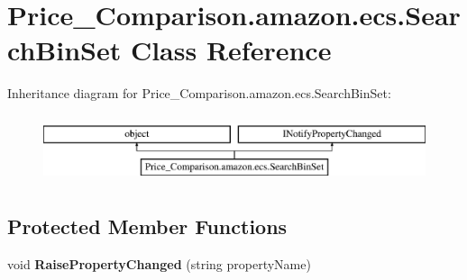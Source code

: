 \hypertarget{class_price___comparison_1_1amazon_1_1ecs_1_1_search_bin_set}{\section{Price\-\_\-\-Comparison.\-amazon.\-ecs.\-Search\-Bin\-Set Class Reference}
\label{class_price___comparison_1_1amazon_1_1ecs_1_1_search_bin_set}
}


 


Inheritance diagram for Price\-\_\-\-Comparison.\-amazon.\-ecs.\-Search\-Bin\-Set\-:\begin{figure}[H]
\begin{center}
\leavevmode
\includegraphics[height=2.000000cm]{class_price___comparison_1_1amazon_1_1ecs_1_1_search_bin_set}
\end{center}
\end{figure}
\subsection*{Protected Member Functions}
\begin{DoxyCompactItemize}
\item 
\hypertarget{class_price___comparison_1_1amazon_1_1ecs_1_1_search_bin_set_a50b2b831dd23735e5b742373e7ac76c7}{void {\bfseries Raise\-Property\-Changed} (string property\-Name)}\label{class_price___comparison_1_1amazon_1_1ecs_1_1_search_bin_set_a50b2b831dd23735e5b742373e7ac76c7}

\end{DoxyCompactItemize}
